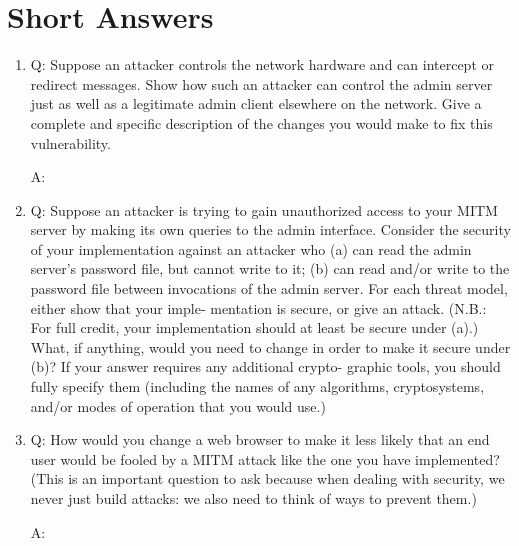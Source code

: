 \section{Short Answers}

\begin{enumerate}[(1)]
\item Q: Suppose an attacker controls the network hardware and can intercept or redirect
messages. Show how such an attacker can control the admin server just as well as 
a legitimate admin client elsewhere on the network. Give a complete and specific description of the changes you would make to fix this vulnerability.

A: 

\item Q: Suppose an attacker is trying to gain unauthorized access to your MITM server
by making its own queries to the admin interface. Consider the security of your
implementation against an attacker who (a) can read the admin server's password
file, but cannot write to it; (b) can read and/or write to the password file between
invocations of the admin server. For each threat model, either show that your imple-
mentation is secure, or give an attack. (N.B.: For full credit, your implementation
should at least be secure under (a).) What, if anything, would you need to change
in order to make it secure under (b)? If your answer requires any additional crypto-
graphic tools, you should fully specify them (including the names of any algorithms,
cryptosystems, and/or modes of operation that you would use.)

\item Q:
How would you change a web browser to make it less likely that an end user would be
fooled by a MITM attack like the one you have implemented? (This is an important
question to ask because when dealing with security, we never just build attacks: we
also need to think of ways to prevent them.)

A: 
\end{enumerate}



